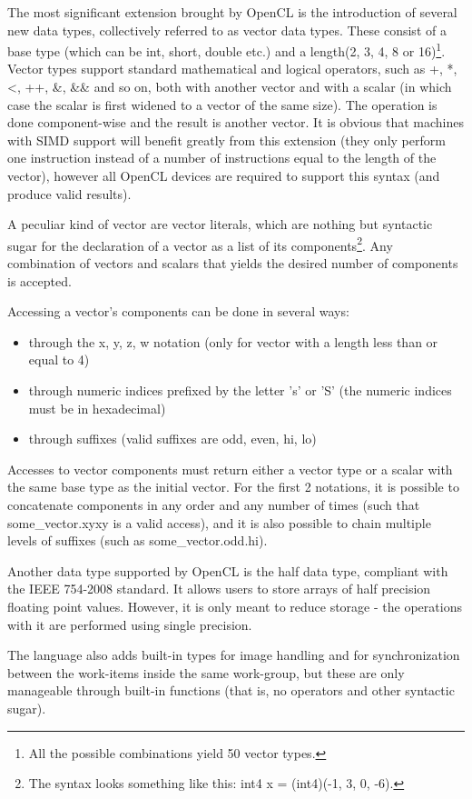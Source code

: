 The most significant extension brought by OpenCL is the introduction of several new data types, collectively referred to as vector data types. These consist of a base type (which can be int, short, double etc.) and a length(2, 3, 4, 8 or 16)\footnote{All the possible combinations yield 50 vector types.}. Vector types support standard mathematical and logical operators, such as +, *, <, ++, \&, \&\& and so on, both with another vector and with a scalar (in which case the scalar is first widened to a vector of the same size). The operation is done component-wise and the result is another vector. It is obvious that machines with SIMD support will benefit greatly from this extension (they only perform one instruction instead of a number of instructions equal to the length of the vector), however all OpenCL devices are required to support this syntax (and produce valid results).

A peculiar kind of vector are vector literals, which are nothing but syntactic sugar for the declaration of a vector as a list of its components\footnote{The syntax looks something like this: int4 x = (int4)(-1, 3, 0, -6).}. Any combination of vectors and scalars that yields the desired number of components is accepted.

Accessing a vector's components can be done in several ways:
\begin{itemize}
\item through the x, y, z, w notation (only for vector with a length less than or equal to 4)
\item through numeric indices prefixed by the letter 's' or 'S' (the numeric indices must be in hexadecimal)
\item through suffixes (valid suffixes are odd, even, hi, lo)
\end{itemize}
Accesses to vector components must return either a vector type or a scalar with the same base type as the initial vector. For the first 2 notations, it is possible to concatenate components in any order and any number of times (such that some\_vector.xyxy is a valid access), and it is also possible to chain multiple levels of suffixes (such as some\_vector.odd.hi).

Another data type supported by OpenCL is the half data type, compliant with the IEEE 754-2008 standard. It allows users to store arrays of half precision floating point values. However, it is only meant to reduce storage - the operations with it are performed using single precision.

The language also adds built-in types for image handling and for synchronization between the work-items inside the same work-group, but these are only manageable through built-in functions (that is, no operators and other syntactic sugar).

